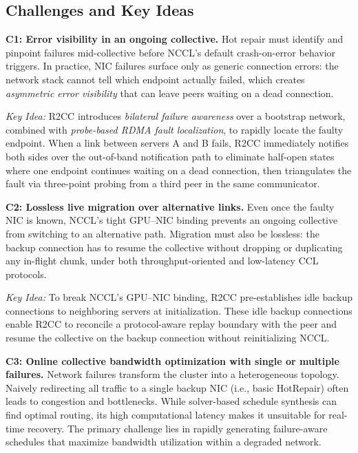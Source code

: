 \documentclass[letterpaper,twocolumn,10pt]{article}
\begin{document}
\subsection{Challenges and Key Ideas}

\textbf{C1: Error visibility in an ongoing collective.} Hot repair must identify and pinpoint failures mid-collective before NCCL's default crash-on-error behavior triggers. In practice, NIC failures surface only as generic connection errors: the network stack cannot tell which endpoint actually failed, which creates \textit{asymmetric error visibility} that can leave peers waiting on a dead connection.

\textit{Key Idea:} R2CC introduces \textit{bilateral failure awareness} over a bootstrap network, combined with \textit{probe-based RDMA fault localization}, to rapidly locate the faulty endpoint. When a link between servers A and B fails, R2CC immediately notifies both sides over the out-of-band notification path to eliminate half-open states where one endpoint continues waiting on a dead connection, then triangulates the fault via three-point probing from a third peer in the same communicator.

\smallskip\noindent\textbf{C2: Lossless live migration over alternative links.} Even once the faulty NIC is known, NCCL's tight GPU--NIC binding prevents an ongoing collective from switching to an alternative path. Migration must also be lossless: the backup connection has to resume the collective without dropping or duplicating any in-flight chunk, under both throughput-oriented and low-latency CCL protocols.

\textit{Key Idea:} To break NCCL's GPU–NIC binding, R2CC pre-establishes idle backup connections to neighboring servers at initialization. These idle backup connections enable R2CC to reconcile a protocol-aware replay boundary with the peer and resume the collective on the backup connection without reinitializing NCCL.

\smallskip\noindent\textbf{C3: Online collective bandwidth optimization with single or multiple failures.} Network failures transform the cluster into a heterogeneous topology. Naively redirecting all traffic to a single backup NIC (i.e., basic HotRepair) often leads to congestion and bottlenecks. While solver-based schedule synthesis can find optimal routing, its high computational latency makes it unsuitable for real-time recovery. The primary challenge lies in rapidly generating failure-aware schedules that maximize bandwidth utilization within a degraded network.
\end{document}
